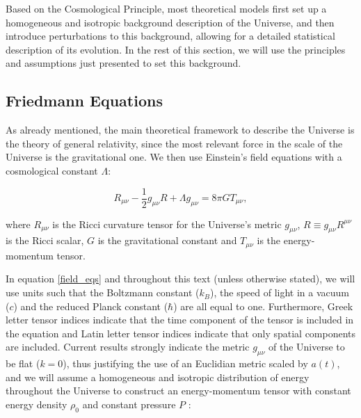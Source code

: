 \documentclass[openany,a4paper,12pt,oneside]{book}
\begin{document}
\begin{spacing}{1.5}

Based on the Cosmological Principle, most theoretical models first set up a homogeneous and isotropic background description of the Universe, and then introduce perturbations to this background, allowing for a detailed statistical description of its evolution. In the rest of this section, we will use the principles and assumptions just presented to set this background.

\subsection{Friedmann Equations}

As already mentioned, the main theoretical framework to describe the Universe is the theory of general relativity, since the most relevant force in the scale of the Universe is the gravitational one. We then use Einstein's field equations with a cosmological constant $\Lambda$:

\begin{equation}\label{field_eqs}
    R_{\mu\nu}-\frac{1}{2}g_{\mu\nu}R+\Lambda g_{\mu\nu}=8\pi GT_{\mu\nu},
\end{equation}

\noindent where $R_{\mu\nu}$ is the Ricci curvature tensor for the Universe's metric $g_{\mu\nu}$, $R\equiv g_{\mu\nu} R^{\mu\nu}$ is the Ricci scalar, $G$ is the gravitational constant and $T_{\mu\nu}$ is the energy-momentum tensor. 

In equation \eqref{field_eqs} and throughout this text (unless otherwise stated), we will use units such that the Boltzmann constant ($k_B$), the speed of light in a vacuum ($c$) and the reduced Planck constant ($\hbar$) are all equal to one. Furthermore, Greek letter tensor indices indicate that the time component of the tensor is included in the equation and Latin letter tensor indices indicate that only spatial components are included. Current results strongly indicate the metric $g_{\mu\nu}$ of the Universe to be flat ($k=0$)\cite{Planck_results}, thus justifying the use of an Euclidian metric scaled by $a(t)$, and we will assume a homogeneous and isotropic distribution of energy throughout the Universe to construct an energy-momentum tensor with constant energy density $\rho_0$ and constant pressure $P$ \cite{dodelson2020modern}:


\end{spacing}
\end{document}
